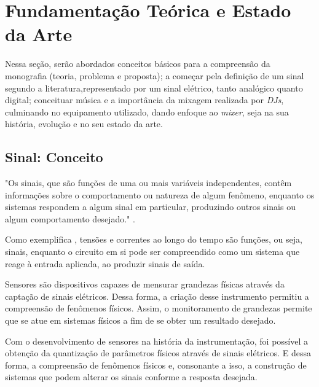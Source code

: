 \chapter[Fundamentação Teórica e Estado da Arte]{Fundamentação Teórica e Estado da Arte}
\label{cha:fundamentacao}
Nessa seção, serão abordados conceitos básicos para a compreensão da monografia (teoria, problema e proposta); a começar pela definição de um sinal segundo a literatura,representado por um sinal elétrico, tanto analógico quanto digital; conceituar música e a importância da mixagem realizada por \textit{DJs}, culminando no equipamento utilizado, dando enfoque ao \textit{mixer}, seja na sua história, evolução e no seu estado da arte.


\section{Sinal: Conceito}

\begin{citacao}
"Os sinais, que são funções de uma ou mais variáveis independentes, contêm informações sobre o comportamento ou natureza de algum fenômeno, enquanto os sistemas respondem a algum sinal em particular, produzindo outros sinais ou algum comportamento desejado." \cite{oppenheim2010sinais}.
\end{citacao}

Como exemplifica \cite{oppenheim2010sinais}, tensões e correntes ao longo do tempo são funções, ou seja, sinais, enquanto o circuito em si pode ser compreendido como um sistema que reage à entrada aplicada, ao produzir sinais de saída.

Sensores são dispositivos capazes de mensurar grandezas físicas através da captação de sinais elétricos. Dessa forma, a criação desse instrumento permitiu a compreensão de fenômenos físicos. Assim, o monitoramento de grandezas permite que se atue em sistemas físicos a fim de se obter um resultado desejado.

Com o desenvolvimento de sensores na história da instrumentação, foi possível a obtenção da quantização de parâmetros físicos através de sinais elétricos. E dessa forma, a compreensão de fenômenos físicos e, consonante a isso, a construção de sistemas que podem alterar os sinais conforme a resposta desejada. 

